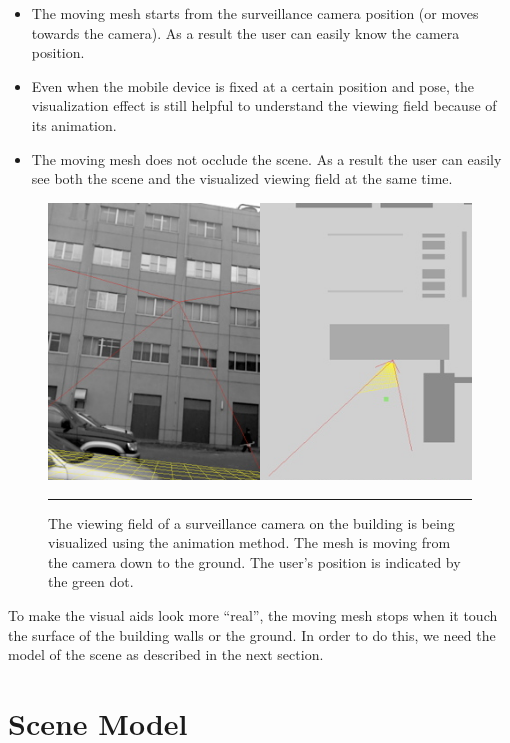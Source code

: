\begin{itemize}
	\item The moving mesh starts from the surveillance camera position (or moves towards the camera). As a result the user can easily know the camera position.
	\item Even when the mobile device is fixed at a certain position and pose, the visualization effect is still helpful to understand the viewing field because of its animation.
	\item The moving mesh does not occlude the scene. As a result the user can easily see both the scene and the visualized viewing field at the same time.
\end{itemize}

\begin{figure}[htbp]
	\centering
	\includegraphics[width=14cm]{./Primitives/theory_animation.png}
	\rule{35em}{0.5pt}
	\caption[Animation method]{The viewing field of a surveillance camera on the building is being visualized using the animation method. The mesh is moving from the camera down to the ground. The user's position is indicated by the green dot.}
	\label{fig:AnimationMethod}
\end{figure}

To make the visual aids look more ``real'', the moving mesh stops when it touch the surface of the building walls or the ground. In order to do this, we need the model of the scene as described in the next section.

\section{Scene Model}
\label{SceneModel}

